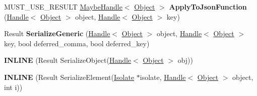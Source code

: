 \begin{DoxyCompactItemize}
\item 
M\+U\+S\+T\+\_\+\+U\+S\+E\+\_\+\+R\+E\+S\+U\+LT \hyperlink{classv8_1_1internal_1_1_maybe_handle}{Maybe\+Handle}$<$ \hyperlink{classv8_1_1internal_1_1_object}{Object} $>$ {\bfseries Apply\+To\+Json\+Function} (\hyperlink{classv8_1_1internal_1_1_handle}{Handle}$<$ \hyperlink{classv8_1_1internal_1_1_object}{Object} $>$ object, \hyperlink{classv8_1_1internal_1_1_handle}{Handle}$<$ \hyperlink{classv8_1_1internal_1_1_object}{Object} $>$ key)\hypertarget{classv8_1_1internal_1_1_b_a_s_e___e_m_b_e_d_d_e_d_a2c4755e034bfa6cdec5bd936445e0f71}{}\label{classv8_1_1internal_1_1_b_a_s_e___e_m_b_e_d_d_e_d_a2c4755e034bfa6cdec5bd936445e0f71}

\item 
Result {\bfseries Serialize\+Generic} (\hyperlink{classv8_1_1internal_1_1_handle}{Handle}$<$ \hyperlink{classv8_1_1internal_1_1_object}{Object} $>$ object, \hyperlink{classv8_1_1internal_1_1_handle}{Handle}$<$ \hyperlink{classv8_1_1internal_1_1_object}{Object} $>$ key, bool deferred\+\_\+comma, bool deferred\+\_\+key)\hypertarget{classv8_1_1internal_1_1_b_a_s_e___e_m_b_e_d_d_e_d_a2471aa66cbc840cdc220edb8ebe3479e}{}\label{classv8_1_1internal_1_1_b_a_s_e___e_m_b_e_d_d_e_d_a2471aa66cbc840cdc220edb8ebe3479e}

\item 
{\bfseries I\+N\+L\+I\+NE} (Result Serialize\+Object(\hyperlink{classv8_1_1internal_1_1_handle}{Handle}$<$ \hyperlink{classv8_1_1internal_1_1_object}{Object} $>$ obj))\hypertarget{classv8_1_1internal_1_1_b_a_s_e___e_m_b_e_d_d_e_d_a1231964a6e835766543c510697333899}{}\label{classv8_1_1internal_1_1_b_a_s_e___e_m_b_e_d_d_e_d_a1231964a6e835766543c510697333899}

\item 
{\bfseries I\+N\+L\+I\+NE} (Result Serialize\+Element(\hyperlink{classv8_1_1internal_1_1_isolate}{Isolate} $\ast$isolate,                                                                                                                           \hyperlink{classv8_1_1internal_1_1_handle}{Handle}$<$ \hyperlink{classv8_1_1internal_1_1_object}{Object} $>$ object,                                                                                                                           int i))\hypertarget{classv8_1_1internal_1_1_b_a_s_e___e_m_b_e_d_d_e_d_a2711a11882bc246a11e6a793429aec6e}{}\label{classv8_1_1internal_1_1_b_a_s_e___e_m_b_e_d_d_e_d_a2711a11882bc246a11e6a793429aec6e}


\end{DoxyCompactItemize}
